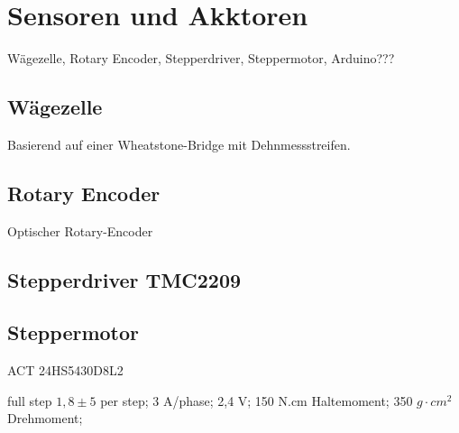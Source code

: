 \section{Sensoren und Akktoren}
\label{sec:Sensoren_Akktoren}

Wägezelle, Rotary Encoder, Stepperdriver, Steppermotor, Arduino???

\subsection{Wägezelle}
\label{subsec:sensor_waegezelle}

Basierend auf einer Wheatstone-Bridge mit Dehnmessstreifen.
\subsection{Rotary Encoder}
\label{subsec:sensor_rotary-encoder}

Optischer Rotary-Encoder
\subsection{Stepperdriver TMC2209}
\label{subsec:sensor_driver}


\subsection{Steppermotor}
\label{subsec:sensor_motor}

ACT 24HS5430D8L2

full step $1,8 \pm 5$ per step;
3 A/phase;
2,4 V;
150 N.cm Haltemoment;
350 $g \cdot cm^2$ Drehmoment;

